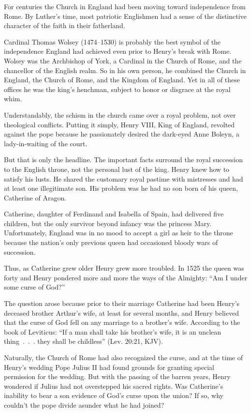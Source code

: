 For centuries the Church in England had been moving toward independence from Rome. By Luther’s time,
most patriotic Englishmen had a sense of the distinctive character of the faith in their fatherland.

Cardinal Thomas Wolsey (1474–1530) is probably the best symbol of the independence England had
achieved even prior to Henry’s break with Rome. Wolsey was the Archbishop of York, a Cardinal in the
Church of Rome, and the chancellor of the English realm. So in his own person, he combined the
Church in England, the Church of Rome, and the Kingdom of England. Yet in all of these offices he
was the king’s henchman, subject to honor or disgrace at the royal whim.

Understandably, the schism in the church came over a royal problem, not over theological conflicts.
Putting it simply, Henry VIII, King of England, revolted against the pope because he passionately
desired the dark-eyed Anne Boleyn, a lady-in-waiting of the court.

But that is only the headline. The important facts surround the royal succession to the English
throne, not the personal lust of the king. Henry knew how to satisfy his lusts. He shared the
customary royal pastime with mistresses and had at least one illegitimate son. His problem was he
had no son born of his queen, Catherine of Aragon.

Catherine, daughter of Ferdinand and Isabella of Spain, had delivered five children, but the only
survivor beyond infancy was the princess Mary. Unfortunately, England was in no mood to accept a
girl as heir to the throne because the nation’s only previous queen had occasioned bloody wars of
succession.

Thus, as Catherine grew older Henry grew more troubled. In 1525 the queen was forty and Henry
pondered more and more the ways of the Almighty: “Am I under some curse of God?”

The question arose because prior to their marriage Catherine had been Henry’s deceased brother
Arthur’s wife, at least for several months, and Henry believed that the curse of God fell on any
marriage to a brother’s wife. According to the book of Leviticus: “If a man shall take his brother’s
wife, it is an unclean thing~.~.~. they shall be childless” (Lev. 20:21, KJV).

Naturally, the Church of Rome had also recognized the curse, and at the time of Henry’s wedding Pope
Julius II had found grounds for granting special permission for the wedding. But with the passing of
the barren years, Henry wondered if Julius had not overstepped his sacred rights. Was Catherine’s
inability to bear a son evidence of God’s curse upon the union? If so, why couldn’t the pope divide
asunder what he had joined?

